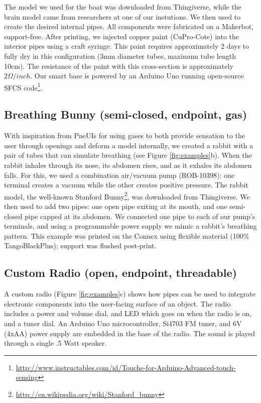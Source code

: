 The model we used for the boat was downloaded from Thingiverse, while the brain model came from researchers at one of our instutions. We then used \systemname to create the desired internal pipes. All components were fabricated on a Makerbot, support-free.  After printing, we injected copper paint (CuPro-Cote) into the interior pipes using a craft syringe.  This paint requires approximately 2 days to fully dry in this configuration (3mm diameter tubes, maximum tube length 10cm).  The resistance of the paint with this cross-section is approximately $2\Omega / inch.$  Our smart base is powered by an Arduino Uno running open-source SFCS code\footnote{\url{http://www.instructables.com/id/Touche-for-Arduino-Advanced-touch-sensing}}.

\subsection{Breathing Bunny (semi-closed, endpoint, gas)}

With inspiration from PneUIs \cite{Yao-pneui} for using gases to both provide sensation to the user through openings and deform a model internally, we created a rabbit with a pair of tubes that can simulate breathing (see Figure \ref{fig:examples}b).  When the rabbit inhales through its nose, its abdomen rises, and as it exhales its abdomen falls.  For this, we used a combination air/vacuum pump (ROB-10398): one terminal creates a vacuum while the other creates positive pressure.  
The rabbit model, the well-known Stanford Bunny\footnote{\url{http://en.wikipedia.org/wiki/Stanford_bunny}}, was downloaded from Thingiverse. We then used \systemname to add two pipes: one open pipe exiting at its mouth, and one semi-closed pipe capped at its abdomen.  We connected one pipe to each of our pump's terminals, and using a programmable power supply we mimic a rabbit's breathing pattern.  This example was printed on the Connex using flexible material (100\% TangoBlackPlus); support was flushed post-print.

\subsection{Custom Radio (open, endpoint, threadable)}
A custom radio (Figure \ref{fig:examples}c) shows how pipes can be used to integrate electronic components into the user-facing surface of an object. The radio includes a power and volume dial, and LED which goes on when the radio is on, and a tuner dial. An Arduino Uno microcontroller, Si4703 FM tuner, and 6V (4xAA) power supply are embedded in the base of the radio. The sound is played through a single .5 Watt speaker. %

